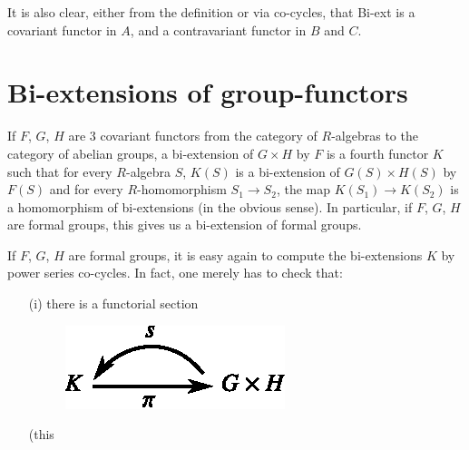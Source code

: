 It is also clear, either from the definition or via co-cycles, that Bi-ext is a covariant functor in $A$, and a contravariant functor in $B$ and $C$.

\section{Bi-extensions of group-functors}\label{art15-sec3}

\begin{defi*}
If $F$, $G$, $H$ are $3$ covariant functors from the category of $R$-algebras to the category of abelian groups, a bi-extension of $G\times H$ by $F$ is a fourth functor $K$ such that for every $R$-algebra $S$, $K(S)$ is a bi-extension of $G(S)\times H(S)$ by $F(S)$ and for every $R$-homomorphism $S_{1}\to S_{2}$, the map $K(S_{1})\to K(S_{2})$ is a homomorphism of bi-extensions (in the obvious sense). In particular, if $F$, $G$, $H$ are formal groups, this gives us a bi-extension of formal groups.
\end{defi*}

If $F$, $G$, $H$ are formal groups, it is easy again to compute the bi-extensions $K$ by power series co-cycles. In fact, one merely has to check that:
\begin{itemize}
\item[(i)] there is a functorial section
\begin{figure}[H]
\centering
\includegraphics{figures/fig2.eps}
\end{figure}
(this\pageoriginale %
\end{itemize}
